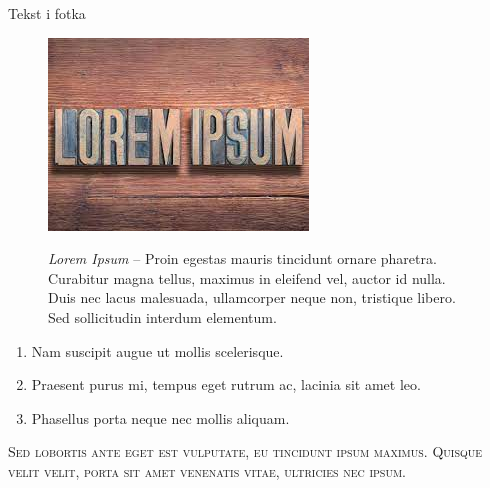 \documentclass{beamer}
\begin{document}
\begin{frame}{Tekst i fotka}

\begin{figure}[htp]
\begin{minipage}{0.33\textwidth}
\centering
\includegraphics[width=\textwidth]{foto3.jpeg}
\end{minipage}
\begin{minipage}{0.66\textwidth}
\centering
\textit{Lorem Ipsum} – Proin egestas mauris tincidunt ornare pharetra. Curabitur magna tellus, maximus in eleifend vel, auctor id nulla. 
Duis nec lacus malesuada, ullamcorper neque non, tristique libero. Sed sollicitudin interdum elementum. 
\end{minipage}
\end{figure}
    
\end{frame}
\begin{frame}

\begin{enumerate}
\item Nam suscipit augue ut mollis scelerisque.
\item Praesent purus mi, tempus eget rutrum ac, lacinia sit amet leo.
\item Phasellus porta neque nec mollis aliquam. 
\end{enumerate}
\textsc{Sed lobortis ante eget est vulputate, eu tincidunt ipsum maximus. Quisque velit velit, porta sit amet venenatis vitae, ultricies 
nec ipsum.}

\end{frame}
\end{document}
